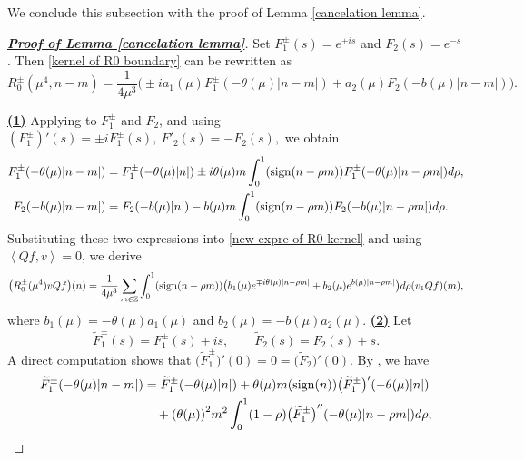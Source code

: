 \documentclass[reqno, 11pt]{amsart}
\newcommand\Z{\mathbb{Z}}
\numberwithin{equation}{section}
\begin{document}
We conclude this subsection with the proof of Lemma \ref{cancelation lemma}.
\begin{proof}[{\bf{\underline{Proof of Lemma \ref{cancelation lemma}}}}]
Set $F^{\pm}_1(s)=e^{\pm is} 
$ and $ F_2(s)=e^{-s}$. Then  \eqref{kernel of R0 boundary} can be rewritten as
\begin{equation}\label{new expre of R0 kernel}
R^{\pm}_0(\mu^4,n-m)=\frac{1}{4\mu^3}\Big(\pm ia_1(\mu)F^{\pm}_1(-\theta(\mu)|n-m|)+a_2(\mu)F_2(-b(\mu)|n-m|)\Big).
\end{equation}

{\bf{\underline{(1)}}} Applying \cite[Lemma 2.5~(i)]{SWY22} to $F^{\pm}_1$ and $F_2$, and using $(F^{\pm}_{1})'(s)=\pm iF^{\pm}_{1}(s), \ F'_2(s)=-F_2(s),$ we obtain
\begin{align}\label{F1F2 taylor Q}
\begin{split}
F^{\pm}_1(-\theta(\mu)|n-m|)&=F^{\pm}_1(-\theta(\mu)|n|)\pm i\theta(\mu)m\int_{0}^{1}({\rm sign}(n-\rho m))F^{\pm}_{1}(-\theta(\mu)|n-\rho m|)d\rho,\\
F_2(-b(\mu)|n-m|)&=F_2(-b(\mu)|n|)-b(\mu)m\int_{0}^{1}({\rm sign}(n-\rho m))F_2(-b(\mu)|n-\rho m|)d\rho.
\end{split}
\end{align}
Substituting these two expressions into \eqref{new expre of R0 kernel} and using $\left<Qf,v\right>=0$, we derive
\begin{equation*}
\big(R^{\pm}_0(\mu^4)vQf\big)(n)
=\frac{1}{4\mu^3}\sum\limits_{m\in\Z}\int_{0}^{1}({\rm sign}(n-\rho m))\big(b_1(\mu)e^{\mp i\theta(\mu)|n-\rho m|}+b_2(\mu)e^{b(\mu)|n-\rho m|}\big)d\rho(v_1Qf)(m),
\end{equation*}
where $b_1(\mu)=-\theta(\mu)a_1(\mu)$ and $b_2(\mu)=-b(\mu)a_2(\mu).$
\vskip0.1cm
{\bf{\underline{(2)}}} Let
\begin{equation}\label{F1pmtuta,F2tuta Sj}
\widetilde{F}^{\pm}_1(s)=F^{\pm}_1(s)\mp is,\qquad  \widetilde{F}_2(s)=F_2(s)+s.
\end{equation}
A direct computation shows that $\big(\widetilde{F}^{\pm}_1\big)'(0)=0=\big(\widetilde{F}_2\big)'(0)$. By \cite[Lemma 2.5~(ii)]{SWY22}, we have
\begin{align}\label{F1F2 taylor Sj}
\begin{split}
\widetilde{F}^{\pm}_1(-\theta(\mu)|n-m|)&=\widetilde{F}^{\pm}_1(-\theta(\mu)|n|)+\theta(\mu)m({\rm sign}(n))\big(\widetilde{F}^{\pm}_1\big)'(-\theta(\mu)|n|)\\
&\quad+{(\theta(\mu))}^2m^2\int_{0}^{1}(1-\rho){\big(\widetilde{F}^{\pm}_1\big)}''(-\theta(\mu)|n-\rho m|)d\rho,\\

\end{split}
\end{align}
\end{proof}
\end{document}
